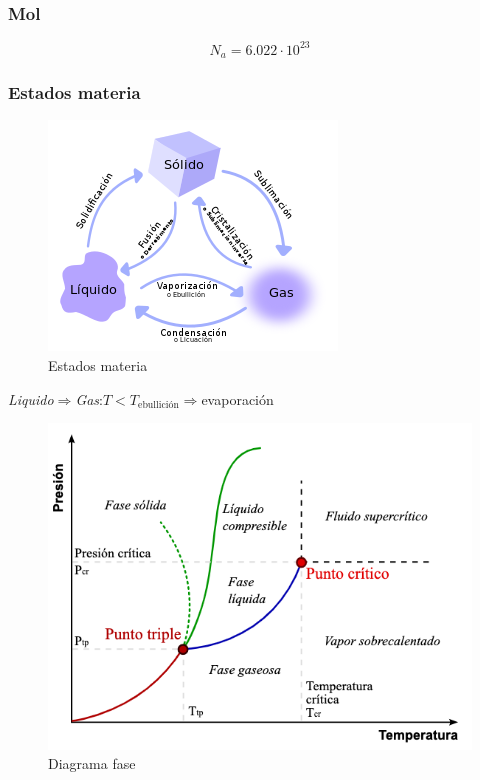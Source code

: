 \documentclass[a4paper,12pt]{article}
\begin{document}
\subsubsection{Mol}
\begin{equation}
    N_a=6.022\cdot10^{23}
\end{equation}
\subsubsection{Estados materia}
\begin{figure}[H]
    \centering
    \includegraphics{Imagenes/QUIM/290px-Estados.png}
    \caption{Estados materia}
    \label{fig:estadosmateria}
\end{figure}
\emph{Liquido$\Rightarrow$Gas}:$T<T_{\text{ebullición}}\Rightarrow$evaporación
\begin{figure}[H]
    \centering
    \includegraphics[width=\textwidth]{Imagenes/QUIM/Phase-diag_es.png}
    \caption{Diagrama fase}
\end{figure}
\end{document}
